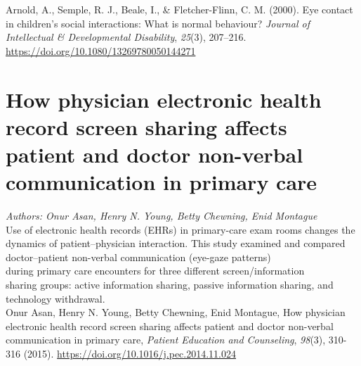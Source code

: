 \documentclass[12pt]{article}
\begin{document}
\noindent Arnold, A., Semple, R. J., Beale, I., \& Fletcher-Flinn, C. M. (2000). Eye contact in children’s social interactions: What is normal behaviour? \textit{Journal of Intellectual \& Developmental Disability}, \textit{25}(3), 207–216. \\\href{https://doi.org/10.1080/13269780050144271}{https://doi.org/10.1080/13269780050144271}

\section{How physician electronic health record screen sharing affects patient and doctor non-verbal communication in primary care}

\noindent\textit{Authors: Onur Asan, Henry N. Young, Betty Chewning, Enid Montague}\\

\noindent Use of electronic health records (EHRs) in primary-care exam rooms changes the dynamics of patient–physician interaction. This study examined and compared doctor–patient non-verbal communication (eye-gaze patterns)\\during primary care encounters for three different screen/information\\sharing groups: active information sharing, passive information sharing, and technology withdrawal.\\

\noindent Onur Asan, Henry N. Young, Betty Chewning, Enid Montague, How physician electronic health record screen sharing affects patient and doctor non-verbal communication in primary care, \textit{Patient Education and Counseling}, \textit{98}(3), 310-316 (2015). \href{https://www.sciencedirect.com/science/article/pii/S0738399114004972}{https://doi.org/10.1016/j.pec.2014.11.024}
\end{document}
